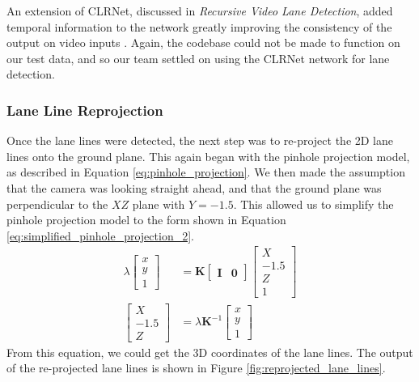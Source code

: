 An extension of CLRNet, discussed in \emph{Recursive Video Lane Detection}, added temporal information to the network greatly improving the consistency of the output on video inputs \cite{RVLD}. Again, the codebase could not be made to function on our test data, and so our team settled on using the CLRNet network for lane detection.

\subsubsection{Lane Line Reprojection}
Once the lane lines were detected, the next step was to re-project the 2D lane lines onto the ground plane. This again began with the pinhole projection model, as described in Equation \ref{eq:pinhole_projection}. We then made the assumption that the camera was looking straight ahead, and that the ground plane was perpendicular to the $XZ$ plane with $Y = -1.5$. This allowed us to simplify the pinhole projection model to the form shown in Equation \ref{eq:simplified_pinhole_projection_2}.
\begin{equation}\label{eq:simplified_pinhole_projection_2}
\begin{aligned}
  \lambda\begin{bmatrix}
    x \\
    y \\
    1
  \end{bmatrix}
  & =
  \mathbf{K}
  \begin{bmatrix}
      \mathbf{I} & \mathbf{0}
  \end{bmatrix}
  \begin{bmatrix}
      X \\
      -1.5 \\
      Z \\
      1
  \end{bmatrix} \\
  \begin{bmatrix}
    X \\
    -1.5 \\
    Z
  \end{bmatrix}
  & =
  \lambda \mathbf{K}^{-1} \begin{bmatrix}
    x \\
    y \\
    1
  \end{bmatrix}
\end{aligned}
\end{equation}
From this equation, we could get the 3D coordinates of the lane lines. The output of the re-projected lane lines is shown in Figure \ref{fig:reprojected_lane_lines}.

